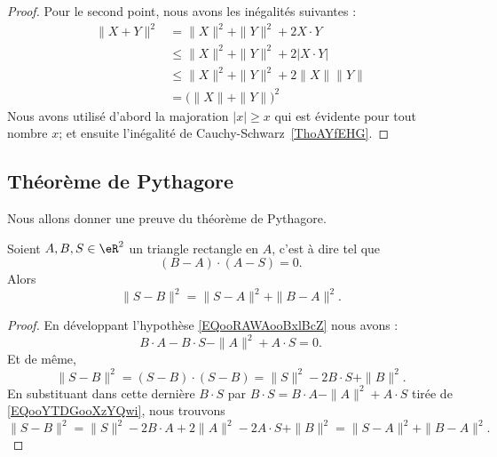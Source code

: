 \begin{proof}
    Pour le second point, nous avons les inégalités suivantes :
	\begin{subequations}
		\begin{align}
			\| X+Y \|^2&=\| X \|^2+\| Y \|^2+2X\cdot Y\\
			&\leq\| X \|^2+\| Y \|^2+2|X\cdot Y|\\
			&\leq\| X \|^2+\| Y \|^2+2\| X \|\| Y \|\\
			&=\big( \| X \|+\| Y \| \big)^2
		\end{align}
	\end{subequations}
    Nous avons utilisé d'abord la majoration $| x |\geq x$ qui est évidente pour tout nombre $x$; et ensuite l'inégalité de Cauchy-Schwarz~\ref{ThoAYfEHG}.
\end{proof}

\subsection{Théorème de Pythagore}

Nous allons donner une preuve du théorème de Pythagore.

\begin{theorem}     \label{THOooHXHWooCpcDan}
    Soient \( A,B,S\in \eR^2\) un triangle rectangle en \( A\), c'est à dire tel que
    \begin{equation}        \label{EQooRAWAooBxlBcZ}
        (B-A)\cdot (A-S)=0.
    \end{equation}
    Alors
    \begin{equation}
        \| S-B \|^2=\| S-A \|^2+\| B-A \|^2.
    \end{equation}
\end{theorem}

\begin{proof}
    En développant l'hypothèse \eqref{EQooRAWAooBxlBcZ} nous avons :
    \begin{equation}    \label{EQooYTDGooXzYQwi}
        B\cdot A-B\cdot S-\| A \|^2+A\cdot S=0.
    \end{equation}
    Et de même,
    \begin{equation}
        \| S-B \|^2=(S-B)\cdot(S-B)=\| S \|^2-2B\cdot S+\| B \|^2.
    \end{equation}
    En substituant dans cette dernière \( B\cdot S\) par \( B\cdot S=B\cdot A -\| A \|^2+A\cdot S \) tirée de \eqref{EQooYTDGooXzYQwi}, nous trouvons
    \begin{equation}
        \| S-B \|^2=\| S \|^2-2B\cdot A+2\| A \|^2-2A\cdot S+\| B \|^2=\| S-A \|^2+\| B-A \|^2.
    \end{equation}
\end{proof}

